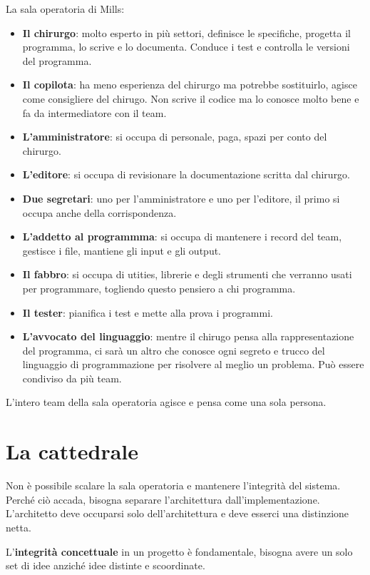 \documentclass[a4paper,12pt,titlepage,oneside]{book}
\begin{document}
La sala operatoria di Mills:
\begin{itemize}
    \item \textbf{Il chirurgo}: molto esperto in più settori, definisce le specifiche, progetta il programma, lo scrive e lo documenta. Conduce i test e controlla le versioni del programma.
    \item \textbf{Il copilota}: ha meno esperienza del chirurgo ma potrebbe sostituirlo, agisce come consigliere del chirugo. Non scrive il codice ma lo conosce molto bene e fa da intermediatore con il team.
    \item \textbf{L'amministratore}: si occupa di personale, paga, spazi per conto del chirurgo.
    \item \textbf{L'editore}: si occupa di revisionare la documentazione scritta dal chirurgo.
    \item \textbf{Due segretari}: uno per l'amministratore e uno per l'editore, il primo si occupa anche della corrispondenza.
    \item \textbf{L'addetto al programmma}: si occupa di mantenere i record del team, gestisce i file, mantiene gli input e gli output.
    \item \textbf{Il fabbro}: si occupa di utities, librerie e degli strumenti che verranno usati per programmare, togliendo questo pensiero a chi programma.
    \item \textbf{Il tester}: pianifica i test e mette alla prova i programmi.
    \item \textbf{L'avvocato del linguaggio}: mentre il chirugo pensa alla rappresentazione del programma, ci sarà un altro che conosce ogni segreto e trucco del linguaggio di programmazione per risolvere al meglio un problema. Può essere condiviso da più team.
\end{itemize}
L'intero team della sala operatoria agisce e pensa come una sola persona.

\section{La cattedrale}
Non è possibile scalare la sala operatoria e mantenere l'integrità del sistema. Perché ciò accada, bisogna separare l'architettura dall'implementazione. L'architetto deve occuparsi solo dell'architettura e deve esserci una distinzione netta.

L'\textbf{integrità concettuale} in un progetto è fondamentale, bisogna avere un solo set di idee anziché idee distinte e scoordinate.
\end{document}
